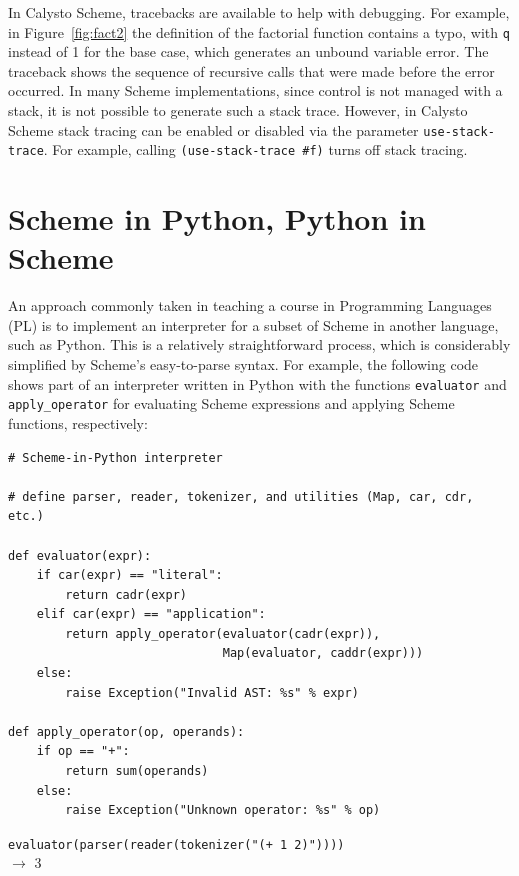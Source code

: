 \documentclass[acmsmall,screen,authorversion]{acmart}
\begin{document}
In Calysto Scheme, tracebacks are available to help with debugging. For
example, in Figure~\ref{fig:fact2} the definition of the factorial function
contains a typo, with \texttt{q} instead of 1 for the base case, which
generates an unbound variable error. The traceback shows the sequence of
recursive calls that were made before the error occurred. In many Scheme
implementations, since control is not managed with a stack, it is not possible
to generate such a stack trace. However, in Calysto Scheme stack tracing can be
enabled or disabled via the parameter \texttt{use-stack-trace}. For example,
calling \texttt{(use-stack-trace~\#f)} turns off stack tracing.

\section{Scheme in Python, Python in Scheme}

An approach commonly taken in teaching a course in Programming Languages (PL)
is to implement an interpreter for a subset of Scheme in another language, such
as Python. This is a relatively straightforward process, which is considerably
simplified by Scheme's easy-to-parse syntax.  For example, the following code
shows part of an interpreter written in Python with the functions
\texttt{evaluator} and \texttt{apply\_operator} for evaluating Scheme
expressions and applying Scheme functions, respectively:\\

\begin{minipage}{\textwidth}
{\small
\begin{verbatim}
# Scheme-in-Python interpreter

# define parser, reader, tokenizer, and utilities (Map, car, cdr, etc.)

def evaluator(expr):
    if car(expr) == "literal":
        return cadr(expr)
    elif car(expr) == "application":
        return apply_operator(evaluator(cadr(expr)),
                              Map(evaluator, caddr(expr)))
    else:
        raise Exception("Invalid AST: %s" % expr)

def apply_operator(op, operands):
    if op == "+":
        return sum(operands)
    else:
        raise Exception("Unknown operator: %s" % op)

\end{verbatim}
\texttt{evaluator(parser(reader(tokenizer("(+ 1 2)"))))}\\
$\rightarrow$ 3\\
}
\end{minipage}
\end{document}
